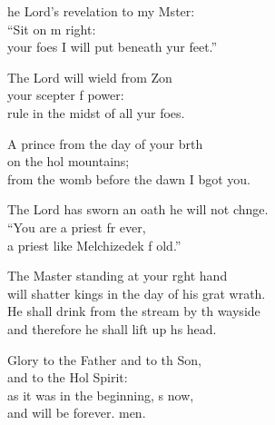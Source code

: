 \settowidth{\versewidth}{will shatter kings in the day of his great wrath.}
\begin{psalmverse}%
  \begin{patverse}
he Lord’s revelation to my Mster:\Flex\\
“Sit on m right:\Med\\
your foes I will put beneath yur feet.”

The Lord will wield from Z\pointup{\i}on\Flex\\
your scepter f power:\Med\\
rule in the midst of all yur foes.

A prince from the day of your b\pointup{\i}rth\Flex\\
on the hol mountains;\Med\\
from the womb before the dawn I bgot you.

The Lord has sworn an oath he will not chnge.\Flex\\
“You are a priest fr ever,\Med\\
a priest like Melchizedek f old.”

The Master standing at your r\pointup{\i}ght hand\Med\\
will shatter kings in the day of his grat wrath.\\
He shall drink from the stream by th wayside\Med\\
and therefore he shall lift up h\pointup{\i}s head.

Glory to the Father and to th Son,\Med\\
and to the Hol Spirit:\\
as it was in the beginning, \pointup{\i}s now,\Med\\
and will be forever. men.
  \end{patverse}
\end{psalmverse}
